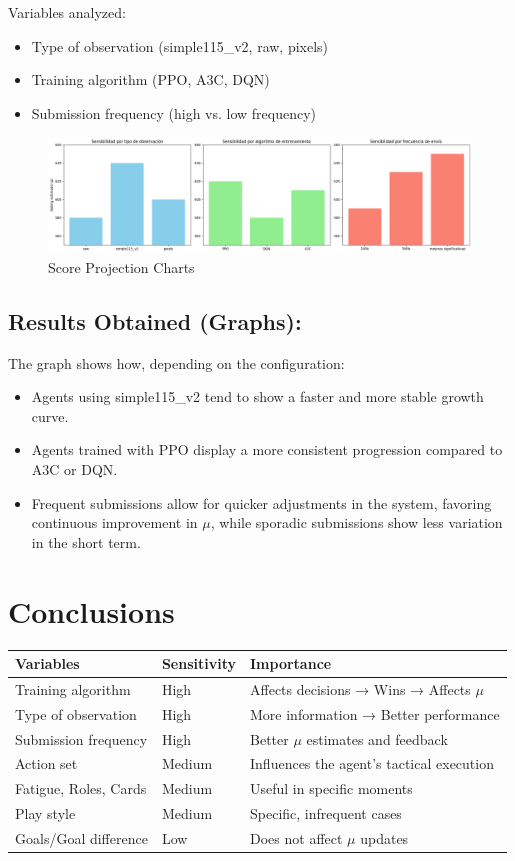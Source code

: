 Variables analyzed:
\begin{itemize}
    \item Type of observation (simple115\_v2, raw, pixels)
    \item Training algorithm (PPO, A3C, DQN)
    \item Submission frequency (high vs. low frequency)
\end{itemize}

\begin{figure}
    \centering
    \includegraphics[width=\linewidth]{grafe} 
    \caption{Score Projection Charts}
    \label{fig:enter-label}
\end{figure}


\subsection*{Results Obtained (Graphs):}
The graph shows how, depending on the configuration:
\begin{itemize}
    \item Agents using simple115\_v2 tend to show a faster and more stable growth curve.
    \item Agents trained with PPO display a more consistent progression compared to A3C or DQN.
    \item Frequent submissions allow for quicker adjustments in the system, favoring continuous improvement in $\mu$, while sporadic submissions show less variation in the short term.
\end{itemize}

\section*{Conclusions}

\begin{tabular}{|l|l|l|}
\hline
Variables & Sensitivity & Importance \\
\hline
Training algorithm & High & Affects decisions → Wins → Affects $\mu$ \\
Type of observation & High & More information → Better performance \\
Submission frequency & High & Better $\mu$ estimates and feedback \\
Action set & Medium & Influences the agent’s tactical execution \\
Fatigue, Roles, Cards & Medium & Useful in specific moments \\
Play style & Medium & Specific, infrequent cases \\
Goals/Goal difference & Low & Does not affect $\mu$ updates \\
\hline
\end{tabular}
